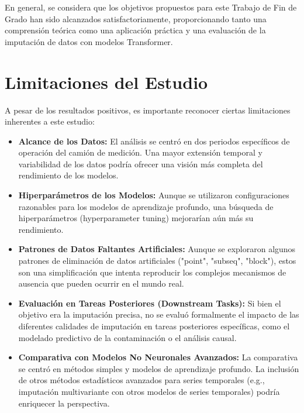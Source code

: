 En general, se considera que los objetivos propuestos para este Trabajo de Fin de Grado han sido alcanzados satisfactoriamente, proporcionando tanto una comprensión teórica como una aplicación práctica y una evaluación de la imputación de datos con modelos Transformer.

\section{Limitaciones del Estudio}
\label{sec:limitaciones}
A pesar de los resultados positivos, es importante reconocer ciertas limitaciones inherentes a este estudio:
\begin{itemize}
    \item \textbf{Alcance de los Datos:} El análisis se centró en dos periodos específicos de operación del camión de medición. Una mayor extensión temporal y variabilidad de los datos podría ofrecer una visión más completa del rendimiento de los modelos.
    \item \textbf{Hiperparámetros de los Modelos:} Aunque se utilizaron configuraciones razonables para los modelos de aprendizaje profundo, una búsqueda  de hiperparámetros (hyperparameter tuning) mejorarían aún más su rendimiento.
    \item \textbf{Patrones de Datos Faltantes Artificiales:} Aunque se exploraron algunos patrones de eliminación de datos artificiales ("point", "subseq", "block"), estos son una simplificación que intenta reproducir los complejos mecanismos de ausencia que pueden ocurrir en el mundo real.
    \item \textbf{Evaluación en Tareas Posteriores (Downstream Tasks):} Si bien el objetivo era la imputación precisa, no se evaluó formalmente el impacto de las diferentes calidades de imputación en tareas posteriores específicas, como el modelado predictivo de la contaminación o el análisis causal.
    \item \textbf{Comparativa con Modelos No Neuronales Avanzados:} La comparativa se centró en métodos simples y modelos de aprendizaje profundo. La inclusión de otros métodos estadísticos avanzados para series temporales (e.g., imputación multivariante con otros modelos de series temporales) podría enriquecer la perspectiva.
\end{itemize}


